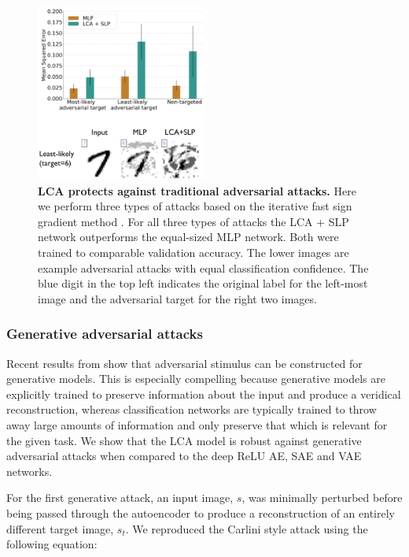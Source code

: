 \begin{figure}
    \centering
    \includegraphics[width=0.5\textwidth]{figures/adversarial_mlp_lca_slp.png}
    \caption{\textbf{LCA protects against traditional adversarial attacks.} Here we perform three types of attacks based on the iterative fast sign gradient method \parencite{kurakin2016adversarial, kos2018adversarial}. For all three types of attacks the LCA + SLP network outperforms the equal-sized MLP network. Both were trained to comparable validation accuracy. The lower images are example adversarial attacks with equal classification confidence. The blue digit in the top left indicates the original label for the left-most image and the adversarial target for the right two images.}
    \label{fig:ch4_adversarial_mlp_vs_lca}
\end{figure}


\subsubsection{Generative adversarial attacks}
Recent results from \parencite{kos2018adversarial, gondim2018adversarial, goodfellow2014explaining} show that adversarial stimulus can be constructed for generative models. This is especially compelling because generative models are explicitly trained to preserve information about the input and produce a veridical reconstruction, whereas classification networks are typically trained to throw away large amounts of information and only preserve that which is relevant for the given task. We show that the LCA model is robust against generative adversarial attacks when compared to the deep ReLU AE, SAE \parencite{ng2011sparse} and VAE \parencite{kingma2013auto} networks.

For the first generative attack, an input image, $s$, was minimally perturbed before being passed through the autoencoder to produce a reconstruction of an entirely different target image, $s_{t}$. We reproduced the Carlini style attack \parencite{carlini2017towards, kos2018adversarial} using the following equation:

